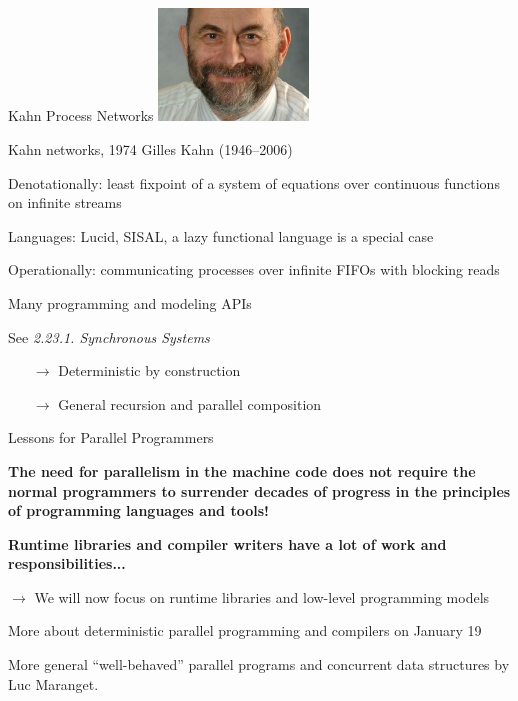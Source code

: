 \documentclass[xcolor=dvipsnames,9pt,mathserif]{beamer}
\renewcommand{\emph}[1]{\alert{#1}}
\begin{document}
\begin{frame}{Kahn Process Networks}
  \hfill\includegraphics[width=4cm]{kahn.jpg}
  
  \begin{block}{Kahn networks, 1974}
    Gilles Kahn (1946--2006)
    
    \medskip
    Denotationally: least fixpoint of a system of equations
    over \emph{continuous} functions on infinite \emph{streams}

    Languages: Lucid, SISAL, a lazy functional language is a special case
    
    \medskip
    Operationally: communicating processes over infinite
    FIFOs with blocking reads

    Many programming and modeling APIs

    \medskip
    See \textit{2.23.1. Synchronous Systems}
  \end{block}
    
  \vfill
  \begin{itemize}
  \item[$\to$] \emph{Deterministic} by construction
  \item[$\to$] General recursion and \emph{parallel composition}
  \end{itemize}
\end{frame}  

\begin{frame}{Lessons for Parallel Programmers}

  {\large \textbf{The need for parallelism in the machine code does
      not require the normal programmers to surrender decades of
      progress in the principles of programming languages and tools!}}

  \bigskip
  {\large \textbf{Runtime libraries and compiler writers have a lot of
      work and responsibilities...}}
  
  \bigskip
  \bigskip
  $\to$ We will now focus on runtime libraries and low-level programming models
  
  \medskip
  More about deterministic parallel programming and compilers on January 19
  
  More general ``well-behaved'' parallel programs and concurrent data
  structures by Luc Maranget.
\end{frame}
\end{document}
